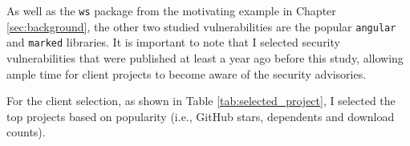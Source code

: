 \vspace{3mm}
\begin{table}[ht]
\centering
\hspace*{-2cm}
\caption{Summary of the three Selected Vulnerable Dependencies}
\label{tab:vulnerability}
\end{table}

As well as the \texttt{ws} package from the motivating example in Chapter \ref{sec:background}, the other two studied vulnerabilities are the popular \texttt{angular} and \texttt{marked} libraries.
It is important to note that I selected security vulnerabilities that were published at least a year ago before this study, allowing ample time for client projects to become aware of the security advisories.

For the client selection, as shown in Table \ref{tab:selected_project}, I selected the top projects based on popularity (i.e., GitHub stars, dependents and download counts).

